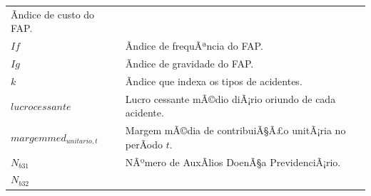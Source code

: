 \documentclass[]{article}
\begin{document}
\begin{longtable}[]{@{}ll@{}}
\begin{minipage}[t]{0.87\columnwidth}
Ãndice de custo do FAP.\strut
\end{minipage}\tabularnewline
\begin{minipage}[t]{0.07\columnwidth}\raggedright\strut
\(If\)\strut
\end{minipage} & \begin{minipage}[t]{0.87\columnwidth}\raggedright\strut
Ãndice de frequÃªncia do FAP.\strut
\end{minipage}\tabularnewline
\begin{minipage}[t]{0.07\columnwidth}\raggedright\strut
\(Ig\)\strut
\end{minipage} & \begin{minipage}[t]{0.87\columnwidth}\raggedright\strut
Ãndice de gravidade do FAP.\strut
\end{minipage}\tabularnewline
\begin{minipage}[t]{0.07\columnwidth}\raggedright\strut
\(k\)\strut
\end{minipage} & \begin{minipage}[t]{0.87\columnwidth}\raggedright\strut
Ãndice que indexa os tipos de acidentes.\strut
\end{minipage}\tabularnewline
\begin{minipage}[t]{0.07\columnwidth}\raggedright\strut
\(lucrocessante\)\strut
\end{minipage} & \begin{minipage}[t]{0.87\columnwidth}\raggedright\strut
Lucro cessante mÃ©dio diÃ¡rio oriundo de cada acidente.\strut
\end{minipage}\tabularnewline
\begin{minipage}[t]{0.07\columnwidth}\raggedright\strut
\(margemmed_{unitario, t}\)\strut
\end{minipage} & \begin{minipage}[t]{0.87\columnwidth}\raggedright\strut
Margem mÃ©dia de contribuiÃ§Ã£o unitÃ¡ria no perÃ­odo \(t\).\strut
\end{minipage}\tabularnewline
\begin{minipage}[t]{0.07\columnwidth}\raggedright\strut
\(N_{b31}\)\strut
\end{minipage} & \begin{minipage}[t]{0.87\columnwidth}\raggedright\strut
NÃºmero de AuxÃ­lios DoenÃ§a PrevidenciÃ¡rio.\strut
\end{minipage}\tabularnewline
\begin{minipage}[t]{0.07\columnwidth}\raggedright\strut
\(N_{b32}\)\strut
\end{minipage} & \begin{minipage}[t]{0.87\columnwidth}\raggedright\strut

\end{minipage}
\end{longtable}
\end{document}

